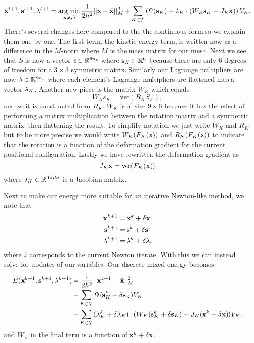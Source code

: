 \begin{equation}
\mathbf{x}^{t+1}, \mathbf{s}^{t+1}, \mathbf{\lambda}^{t+1} = \operatorname*{arg\,min}_{\mathbf{x},\mathbf{s},\mathbf{\lambda}} \frac{1}{2h^2}||\mathbf{x} - \tilde{\mathbf{x}}||_M^2 
+ \sum_{K \in \mathcal{T}} \left( \Psi(\mathbf{s}_K) - \mathbf{\lambda}_K \cdot (W_K \mathbf{s}_K - J_K \mathbf{x}) \right) V_K.
\end{equation}
There's several changes here compared to the the continuous form so we explain them one-by-one. The first term, the kinetic energy term, is written now as a difference in the $M$-norm where $M$ is the mass matrix for our mesh. Next we see that $S$ is now a vector $\mathbf{s} \in \mathbb{R}^{6n_e}$ where $\mathbf{s}_K \in \mathbb{R}^6$ because there are only 6 degrees of freedom for a $3 \times 3$ symmetric matrix. Similarly our Lagrange multipliers are now $\mathbf{\lambda} \in \mathbb{R}^{9n_e}$ where each element's Lagrange multipliers are flattened into a vector $\mathbf{\lambda}_K$. Another new piece is the matrix $W_K$ which equals
\begin{equation}
W_K s_K = \text{vec}(R_K S_K),
\end{equation}
and so it is constructed from $R_K$. $W_K$ is of size $9 \times 6$ because it has the effect of performing a matrix multiplication between the rotation matrix and a symmetric matrix, then flattening the result. To simplify notation we just write $W_K$ and $R_K$ but to be more precise we would write $W_K(F_K(\mathbf{x}))$ and $R_K(F_K(\mathbf{x}))$ to indicate that the rotation is a function of the deformation gradient for the current positional configuration. Lastly we have rewritten the deformation gradient as
\begin{equation}
J_K \mathbf{x} = \text{vec}(F_K(\mathbf{x}))
\end{equation}
where $J_K \in \mathbb{R}^{9 \times dn}$ is a Jacobian matrix. 

Next to make our energy more suitable for an iterative Newton-like method, we note that
\begin{align*}
\mathbf{x}^{k+1} &= \mathbf{x}^k + \delta \mathbf{x} \\
\mathbf{s}^{k+1} &= \mathbf{s}^k + \delta \mathbf{s} \\
\mathbf{\lambda}^{k+1} &= \mathbf{\lambda}^k + \delta \mathbf{\lambda},
\end{align*}
where $k$ corresponds to the current Newton iterate. With this we can instead solve for updates of our variables. Our discrete mixed energy becomes
\begin{equation}
\begin{split}
E(\mathbf{x}^{k+1}, \mathbf{s}^{k+1}, \mathbf{\lambda}^{k+1}) &= \frac{1}{2h^2}||\mathbf{x}^{k+1} - \tilde{\mathbf{x}}||_M^2 \\
&+ \sum_{K \in \mathcal{T}} \Psi(\mathbf{s}_K^k + \delta \mathbf{s}_K) V_K  \\
&-  \sum_{K \in \mathcal{T}} (\mathbf{\lambda}_K^k + \delta \mathbf{\lambda}_K) \cdot (W_K (\mathbf{s}_K^k + \delta \mathbf{s}_K) - J_K(\mathbf{x}^k + \delta \mathbf{x})) V_K.
\end{split}
\end{equation}
and $W_K$ in the final term is a function of $\mathbf{x}^k + \delta \mathbf{x}$. 


